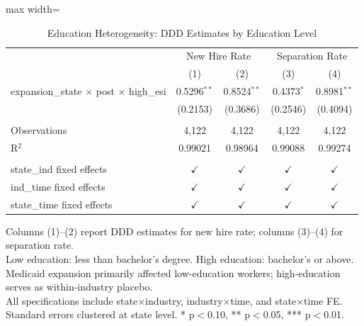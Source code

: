 
\begin{table}[htbp]
   \caption{\label{tab:education} Education Heterogeneity: DDD Estimates by Education Level}
   \bigskip
   \centering
   \begin{adjustbox}{max width=\textwidth}
   \begin{tabular}{lcccc}
      \toprule
       & \multicolumn{2}{c}{New Hire Rate} & \multicolumn{2}{c}{Separation Rate}\\
                                                            & (1)           & (2)           & (3)           & (4)\\  
      \midrule 
      expansion\_state $\times$ post $\times$ high\_esi     & 0.5296$^{**}$ & 0.8524$^{**}$ & 0.4373$^{*}$  & 0.8981$^{**}$\\   
                                                            & (0.2153)      & (0.3686)      & (0.2546)      & (0.4094)\\   
       \\
      Observations                                          & 4,122         & 4,122         & 4,122         & 4,122\\  
      R$^2$                                                 & 0.99021       & 0.98964       & 0.99088       & 0.99274\\  
       \\
      state\_ind fixed effects                              & $\checkmark$  & $\checkmark$  & $\checkmark$  & $\checkmark$\\   
      ind\_time fixed effects                               & $\checkmark$  & $\checkmark$  & $\checkmark$  & $\checkmark$\\   
      state\_time fixed effects                             & $\checkmark$  & $\checkmark$  & $\checkmark$  & $\checkmark$\\   
      \bottomrule
   \end{tabular}
   \end{adjustbox}
   
   \par \raggedright 
   Columns (1)--(2) report DDD estimates for new hire rate; columns (3)--(4) for separation rate.\\
   Low education: less than bachelor's degree. High education: bachelor's or above.\\
   Medicaid expansion primarily affected low-education workers; high-education serves as within-industry placebo.\\
   All specifications include state$\times$industry, industry$\times$time, and state$\times$time FE.\\
   Standard errors clustered at state level. * p$<$0.10, ** p$<$0.05, *** p$<$0.01.
\end{table}


